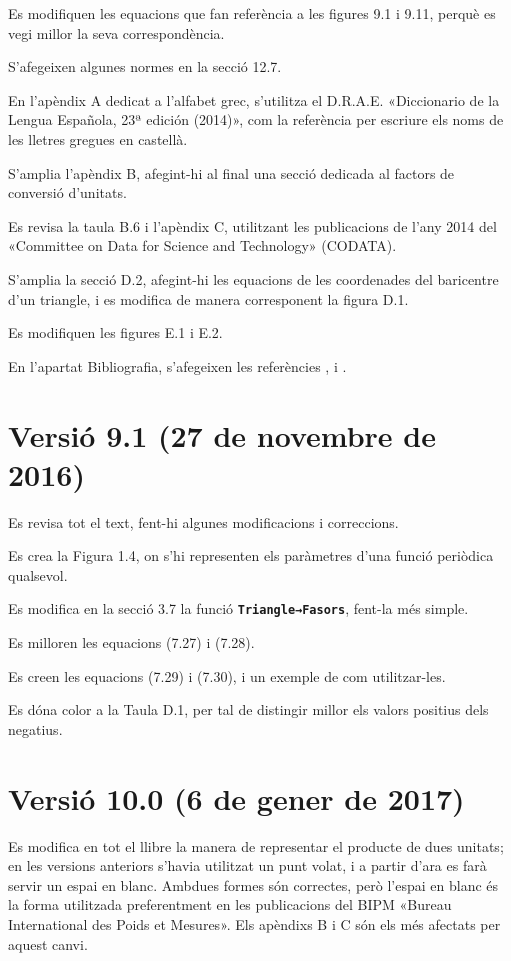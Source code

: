 Es modifiquen les equacions que fan referència a les figures 9.1 i 9.11, perquè es vegi millor la seva correspondència.

S'afegeixen algunes normes en la secció 12.7.

En l'apèndix A dedicat a l'alfabet grec, s'utilitza el D.R.A.E.
«Diccionario de la Lengua Española, 23ª
edición (2014)», com la referència per escriure els noms de les lletres gregues en castellà.

S'amplia l'apèndix B, afegint-hi al final una secció dedicada al factors de conversió d'unitats.

Es revisa la taula B.6 i l'apèndix C, utilitzant les publicacions de l'any 2014 del «Committee on Data for Science and Technology» (CODATA).


S'amplia la secció D.2, afegint-hi les equacions de les coordenades del baricentre d'un triangle, i es modifica de manera corresponent la figura D.1.

Es modifiquen les figures E.1 i E.2.

En l'apartat Bibliografia, s'afegeixen les referències \cite{VOS}, \cite{WMF} i \cite{TRA}.


\section*{Versió 9.1 (27 de novembre de 2016)}

Es revisa tot el text, fent-hi algunes  modificacions i correccions.

Es crea la Figura 1.4, on s'hi representen els paràmetres d'una funció periòdica qualsevol.

Es modifica en la secció 3.7 la funció \texttt{\textbf{Triangle→Fasors}}, fent-la més simple.

Es milloren les equacions (7.27) i (7.28).

Es creen les equacions (7.29) i (7.30), i un exemple de com utilitzar-les.

Es dóna color a la Taula D.1, per tal de distingir millor els valors positius dels negatius.

\section*{Versió 10.0 (6 de gener de 2017)}

Es modifica en tot el llibre la manera de representar el producte de dues unitats; en les versions anteriors s'havia utilitzat un punt volat, i a partir d'ara es farà servir un espai en blanc. Ambdues formes són correctes, però l'espai en blanc és la forma utilitzada preferentment en les publicacions del BIPM «Bureau International des Poids et Mesures». Els apèndixs B i C són els més afectats per aquest canvi.

